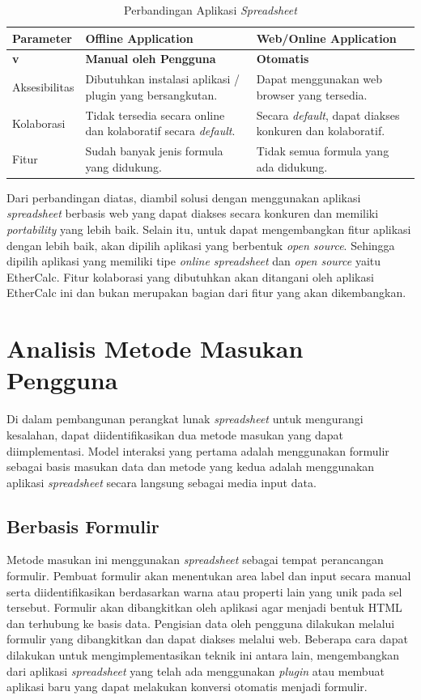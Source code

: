 \begin{longtable}{ | p{3cm} | p{4cm} | p{4cm} | }
    \caption{Perbandingan Aplikasi \textit{Spreadsheet}}
    \label{AnalisisAplikasiDasar}\\ \hline
    \centering\bfseries{Parameter} & \centering\bfseries{Offline Application} & \centering\bfseries{Web/Online Application} \tabularnewline \hline
    \endfirsthead
    \hline
    \centering\bfseries{v} & \centering\bfseries{Manual oleh Pengguna} & \centering\bfseries{Otomatis} \tabularnewline \hline
    \endhead
    Aksesibilitas & Dibutuhkan instalasi aplikasi / plugin yang bersangkutan. & Dapat menggunakan web browser yang tersedia. \\ \hline
    Kolaborasi & Tidak tersedia secara online dan kolaboratif secara \textit{default}. & Secara \textit{default}, dapat diakses konkuren dan kolaboratif. \\ \hline
    Fitur & Sudah banyak jenis formula yang didukung. & Tidak semua formula yang ada didukung. \\ \hline
\end{longtable}

Dari perbandingan diatas, diambil solusi dengan menggunakan aplikasi \textit{spreadsheet} berbasis web yang dapat diakses secara konkuren dan memiliki \textit{portability} yang lebih baik. Selain itu, untuk dapat mengembangkan fitur aplikasi dengan lebih baik, akan dipilih aplikasi yang berbentuk \textit{open source}. Sehingga dipilih aplikasi yang memiliki tipe \textit{online spreadsheet} dan \textit{open source} yaitu EtherCalc. Fitur kolaborasi yang dibutuhkan akan ditangani oleh aplikasi EtherCalc ini dan bukan merupakan bagian dari fitur yang akan dikembangkan.

\section{Analisis Metode Masukan Pengguna}
Di dalam pembangunan perangkat lunak \textit{spreadsheet} untuk mengurangi kesalahan, dapat diidentifikasikan dua metode masukan yang dapat diimplementasi. Model interaksi yang pertama adalah menggunakan formulir sebagai basis masukan data dan metode yang kedua adalah menggunakan aplikasi \textit{spreadsheet} secara langsung sebagai media input data.
	\subsection{Berbasis Formulir}
	Metode masukan ini menggunakan \textit{spreadsheet} sebagai tempat perancangan formulir. Pembuat formulir akan menentukan area label dan input secara manual serta diidentifikasikan berdasarkan warna atau properti lain yang unik pada sel tersebut. Formulir akan dibangkitkan oleh aplikasi agar menjadi bentuk HTML dan terhubung ke basis data. Pengisian data oleh pengguna dilakukan melalui formulir yang dibangkitkan dan dapat diakses melalui web. Beberapa cara dapat dilakukan untuk mengimplementasikan teknik ini antara lain, mengembangkan dari aplikasi \textit{spreadsheet} yang telah ada menggunakan \textit{plugin} atau membuat aplikasi baru yang dapat melakukan konversi otomatis menjadi formulir.

